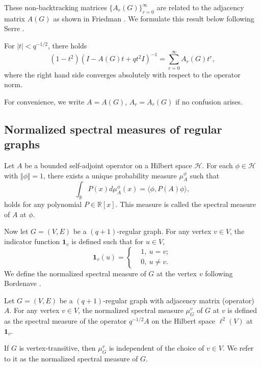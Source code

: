 \documentclass{article}
\begin{document}
These non-backtracking matrices $\{A_r(G)\}_{r=0}^{\infty}$ are related to the adjacency matrix $A(G)$ as shown in Friedman \cite{Fri91}. We formulate this result below following Serre \cite{Ser97}.
\begin{lemma}\label{green}
    For $|t|<q^{-1/2}$, there holds
\begin{equation}\label{recurrencerelationnbmatrices}
    (1-t^2) (I-A(G)t+qt^2I)^{-1}=\sum_{r=0}^{\infty}A_{r}(G)t^r,
\end{equation}
    where the right hand side converges absolutely with respect to the operator norm.
\end{lemma}

For convenience, we write $A=A(G)$, $A_r=A_{r}(G)$ if no confusion arises. 

\subsection{Normalized spectral measures of regular graphs}


Let $A$ be a bounded self-adjoint operator on a Hilbert space $\mathcal{H}$. For each $\phi \in \mathcal{H}$ with $\Vert \phi\Vert=1$, there exists a unique probability measure $\mu_{A}^{\phi}$ such that
\begin{equation*}
\int_\mathbb{R} P(x) d\mu_{A}^{\phi} (x)=\langle \phi, P(A) \phi \rangle,
\end{equation*}
 holds for any polynomial $P \in \mathbb{R}[x]$.
This measure is called the spectral measure of $A$ at $\phi$. 

Now let $G=(V,E)$ be a $(q+1)$-regular graph. For any vertex $v\in V$, the indicator function $\mathbf{1}_{v}$ is defined such that for $u\in V$,
$$\mathbf{1}_{v}(u)=\left\{
\begin{aligned}
    &1, \ u=v;\\
    &0, \ u\neq v.
\end{aligned} \right.$$ 
We define the normalized spectral measure of $G$ at the vertex $v$ following Bordenave \cite{Bor16}.
\begin{definition}\label{def:spectralmeasureatvertex} Let $G=(V,E)$ be a $(q+1)$-regular graph with adjacency matrix (operator) $A$. For any vertex $v\in V$, the normalized spectral measure $\mu_G^{v}$ of $G$ at $v$ is defined as the spectral measure of the operator $q^{-1/2}A$ on the Hilbert space $\ell^2(V)$ at $\mathbf{1}_v$.

If $G$ is vertex-transitive, then $\mu_G^{v}$ is independent of the choice of $v\in V$. We refer to it as the normalized spectral measure of $G$.
\end{definition}
\end{document}

